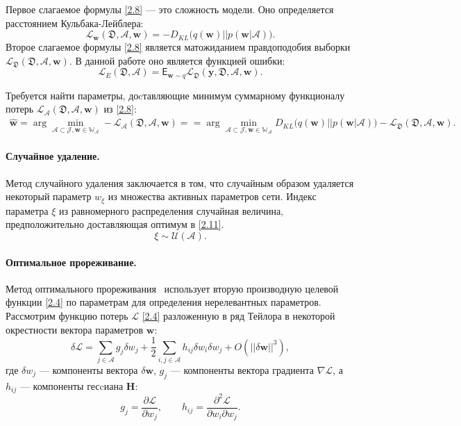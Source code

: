 Первое слагаемое формулы \eqref{2.8} --- это сложность модели. Оно определяется расстоянием Кульбака-Лейблера:
\[
\label{2.9}
\mathcal{L}_\textbf{w}(\mathfrak{D}, \mathcal{A}, \textbf{w}) = -D_{KL}\bigl(q(\textbf{w})||p(\textbf{w}|\mathcal{A})\bigr).
\]
Второе слагаемое формулы \eqref{2.8} является матожиданием правдоподобия выборки $\mathcal{L}_\mathfrak{D}(\mathfrak{D},\mathcal{A}, \textbf{w})$. В данной работе оно является функцией ошибки:
\[
\label{2.10}
\mathcal{L}_{E}(\mathfrak{D},\mathcal{A}) = \mathsf{E}_{\textbf{w}\sim q}\mathcal{L}_\mathfrak{D}(\textbf{y}, \mathfrak{D}, \mathcal{A}, \textbf{w}).
\]

Требуется найти параметры, доcтавляющие минимум суммарному функционалу потерь $\mathcal{L}_\mathcal{A}(\mathfrak{D},\mathcal{A},\textbf{w})$ из \eqref{2.8}:
\[
\label{2.11}
\begin{aligned}
\hat{\textbf{w}} = \arg\min_{\mathcal{A}\subset\mathcal{J}, \textbf{w} \in \mathbb{W_\mathcal{A}}} -\mathcal{L}_\mathcal{A}(\mathfrak{D}, \mathcal{A}, \textbf{w}) = 
=\arg\min_{\mathcal{A}\subset\mathcal{J}, \textbf{w} \in \mathbb{W_\mathcal{A}}} D_{KL}\bigl(q(\textbf{w})||p(\textbf{w}|\mathcal{A})\bigr) - \mathcal{L}_\mathfrak{D}(\mathfrak{D}, \mathcal{A}, \textbf{w}).
\end{aligned}
\]

\paragraph{Случайное удаление.}
Метод случайного удаления заключается в том, что случайным образом удаляется некоторый параметр $w_\xi$ из множества активных параметров сети.  Индекс параметра $\xi$ из равномерного распределения  случайная величина, предположительно доставляющая оптимум в \eqref{2.11}.
\[
\label{3.1.1}
\xi \sim \mathcal{U}(\mathcal{A}).
\]

\paragraph{Оптимальное прореживание.}
Метод оптимального прореживания~\cite{cun1990} использует вторую производную целевой функции \eqref{2.4} по параметрам для определения нерелевантных параметров. Рассмотрим функцию потерь $\mathcal{L}$ \eqref{2.4} разложенную в ряд Тейлора в некоторой окрестности вектора параметров $\textbf{w}$:
\[
\label{3.2.1}
\delta \mathcal{L} = \sum_{j\in \mathcal{A}} g_j\delta w_j + \frac{1}{2}\sum_{i,j\in \mathcal{A}} h_{ij}\delta w_i\delta w_j + O(||\delta\textbf{w}||^3),
\]
где $\delta w_j $ --- компоненты вектора $\delta\textbf{w}$, $g_j$ --- компоненты вектора градиента $\nabla \mathcal{L}$, а $h_{ij}$ --- компоненты гесcиана $\textbf{H}$:
\[
\label{3.2.2}
g_j = \frac{\partial \mathcal{L}}{\partial w_j}, \qquad h_{ij} = \frac{\partial^2\mathcal{L}}{\partial w_i \partial w_j}.
\]

